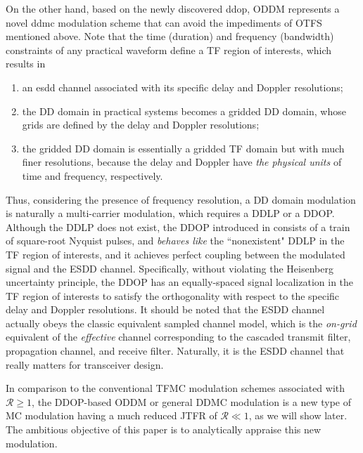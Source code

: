 \documentclass[journal]{IEEEtran}
\begin{document}
On the other hand, based on the newly discovered \ac{ddop}, ODDM represents a novel \ac{ddmc} modulation scheme that can avoid the impediments of OTFS mentioned above\cite{oddm}.
Note that the time (duration) and frequency (bandwidth) constraints of any practical waveform define a TF region of interests, which results in 
\begin{enumerate}
\item an \ac{esdd} channel associated with its specific delay and Doppler resolutions\cite{bello};
\item the DD domain in practical systems becomes a gridded DD domain, whose grids are defined by the delay and Doppler resolutions;
\item  the gridded DD domain is essentially a gridded TF domain but with much finer resolutions, {because the delay and Doppler have \emph{the physical units} of time and frequency, respectively.} 
\end{enumerate}
Thus, considering the presence of frequency resolution, a DD domain modulation is naturally a multi-carrier modulation, which requires a DDLP or a DDOP.
  Although the DDLP does not exist,
the DDOP introduced in \cite{oddmicc22,oddm,ddop} consists of a train of square-root Nyquist pulses, and \emph{behaves like} the ``nonexistent" DDLP in the TF region of interests,  and it achieves perfect coupling between the modulated signal and the ESDD channel.
Specifically, without violating the Heisenberg uncertainty principle, the DDOP has an equally-spaced signal localization in the TF region of interests\cite{ddop} to satisfy the orthogonality with respect to the specific delay and Doppler resolutions.
It should be noted that the ESDD channel actually obeys the classic equivalent sampled channel model\cite{fwc,bello}, which is the \emph{on-grid} equivalent of the \emph{effective} channel corresponding to the cascaded transmit filter, propagation channel, and receive filter. Naturally, it is the ESDD channel that really matters for transceiver design.

In comparison to the conventional TFMC modulation schemes associated with $\mathcal R \ge 1$, the DDOP-based ODDM or general DDMC modulation is a new type of MC modulation having a much reduced JTFR of $\mathcal R \ll 1$, as we will show later. The ambitious objective of this paper is to analytically appraise this new modulation.
\end{document}
